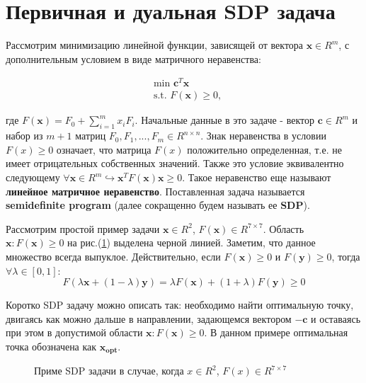 
\section{Первичная и дуальная SDP задача}
Рассмотрим минимизацию линейной функции, зависящей от вектора $\bm{x} \in R^m$,
с дополнительным условием в виде матричного неравенства:

\begin{equation}\label{sdp-problem-def}
\begin{split}
    & \text{min }\bm{c}^T \bm{x}  \\
    & \text{s.t. } F(\bm{x} ) \geq 0,
\end{split}
\end{equation}

где $F(\bm{x}) = F_0 + \sum\limits_{i=1}^{m} x_i F_i$. Начальные данные в 
это задаче - вектор  $\bm{c} \in R^m$ и набор из $m+1$ матриц 
$F_0, F_1, ..., F_m \in R^{n \times n}$. Знак неравенства в условии 
$F(x) \geq 0$ означает, что матрица $F(x)$ положительно определенная, 
т.е. не имеет отрицательных собственных значений.
Также это условие эквивалентно следующему
$\forall \bm{x} \in R^m \hookrightarrow \bm{x}^TF(\bm{x})\bm{x} \geq 0$.
Такое неравенство еще называют \textbf{линейное матричное неравенство}.
Поставленная задача называется  \textbf{semidefinite program}
(далее сокращенно будем называть ее \textbf{SDP}).

Рассмотрим простой пример задачи $\bm{x}\in R^2$, $F(\bm{x})\in R^{7 \times 7}$.
Область $\bm{x}: F(\bm{x}) \geq 0$ на рис.(\ref{ris:sdp-example}) выделена черной линией.
Заметим, что данное множество всегда выпуклое.
Действительно, если $F(\bm{x}) \geq 0$ и $F(\bm{y}) \geq 0$,
тогда $\forall \lambda \in [0, 1]$:
\begin{equation}\label{sdp-convex}
F(\lambda \bm{x} + (1-\lambda) \bm{y})=
\lambda F(\bm{x}) + (1+\lambda) F(\bm{y}) \geq 0
\end{equation}

Коротко SDP задачу можно описать так: необходимо найти оптимальную точку, двигаясь как можно дальше в направлении, 
задающемся вектором $- \bm{c}$ и оставаясь при этом в допустимой области $\bm{x}: F(\bm{x}) \geq 0$.
В данном примере оптимальная точка обозначена как $\bm{x_{opt}}$.
\begin{figure}[h]
\caption{Приме SDP задачи в случае, когда $x\in R^2$, $F(x)\in R^{7 \times 7}$}
\label{ris:sdp-example}
\end{figure}

